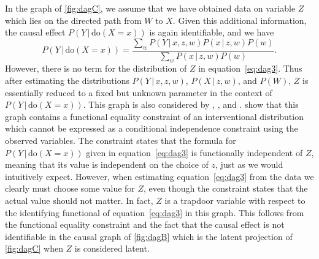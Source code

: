 \documentclass[11pt,a4paper,twoside]{article}
\newcommand{\+}[1]{\ensuremath{\mathbf{#1}}}
\newcommand{\doo}{\textrm{do}}
\newcommand{\given}{{ \, | \, }}
\newcommand{\z}{trapdoor variable}
\begin{document}
	In the graph of \autoref{fig:dagC}, we assume that we have obtained data on variable $Z$ which lies on the directed path from $W$ to $X$. Given this additional information, the causal effect $P(Y \given \doo(X = x))$ is again identifiable, and we have 
	\begin{equation}
	\label{eq:dag3}
	P(Y \given \doo(X = x)) = \frac{\sum_{w}P(Y\given x, z, w)P(x \given z, w)P(w)}{\sum_{w}P(x \given z, w)P(w)}.
	\end{equation}
	However, there is no term for the distribution of $Z$ in equation~\eqref{eq:dag3}. Thus after estimating the distributions $P(Y \given  x, z, w)$, $P(X \given z, w)$, and $P(W)$, $Z$ is essentially reduced to a fixed but unknown parameter in the context of $P(Y \given \doo(X = x))$. This graph is also considered by \citet{TianPearl2002}, \citet{why}, and \citet{jung2020}. \citet{TianPearl2002} show that this graph contains a functional equality constraint of an interventional distribution which cannot be expressed as a conditional independence constraint using the observed variables. The constraint states that the formula for $P(Y \given \doo(X = x))$ given in equation~\eqref{eq:dag3} is functionally independent of $Z$, meaning that its value is independent on the choice of $z$, just as we would intuitively expect. However, when estimating equation~\eqref{eq:dag3} from the data we clearly must choose some value for $Z$, even though the constraint states that the actual value should not matter. In fact, $Z$ is a \z{} with respect to the identifying functional of equation~\eqref{eq:dag3} in this graph. This follows from the functional equality constraint and the fact that the causal effect is not identifiable in the causal graph of \autoref{fig:dagB} which is the latent projection of \autoref{fig:dagC} when $Z$ is considered latent. 
	
\end{document}
